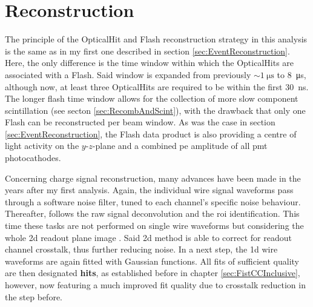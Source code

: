 \section{Reconstruction}\label{sec:NewReconstruction}
The principle of the \gls{OpticalHit} and \gls{Flash} reconstruction strategy in this analysis is the same as in my first one described in section \ref{sec:EventReconstruction}. Here, the only difference is the time window within which the \glspl{OpticalHit} are associated with a \gls{Flash}. Said window is expanded from previously $\sim\SI{1}{\micro\second}$ to \SI{8}{\micro\second}, although now, at least three \glspl{OpticalHit} are required to be within the first \SI{30}{\nano\second}. The longer flash time window allows for the collection of more slow component scintillation (see secton \ref{sec:RecombAndScint}), with the drawback that only one \gls{Flash} can be reconstructed per beam window. As was the case in section \ref{sec:EventReconstruction}, the \gls{Flash} data product is also providing a centre of light activity on the $y$-$z$-plane and a combined \gls{pe} amplitude of all \gls{pmt} photocathodes.

Concerning charge signal reconstruction, many advances have been made in the years after my first analysis. Again, the individual wire signal waveforms pass through a software noise filter, tuned to each channel's specific noise behaviour. Thereafter, follows the raw signal deconvolution and the \gls{roi} identification. This time these tasks are not performed on single wire waveforms but considering the whole \gls{2d} readout plane image \cite{LArTPCReadoutWires,MicroBooNESimData}. Said \gls{2d} method is able to correct for readout channel crosstalk, thus further reducing noise. In a next step, the \gls{1d} wire waveforms are again fitted with Gaussian functions. All fits of sufficient quality are then designated \textbf{hits}, as established before in chapter \ref{sec:FistCCInclusive}, however, now featuring a much improved fit quality due to crosstalk reduction in the step before.

